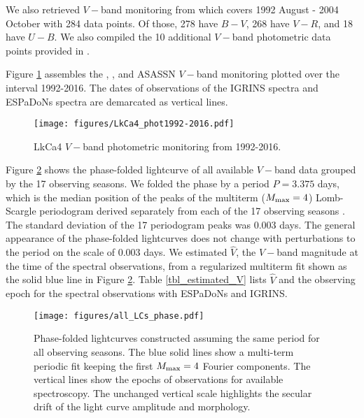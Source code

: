 \documentclass[onecolumn]{emulateapj}%
\newcommand{\name}{LkCa4 }
\begin{document}
We also retrieved $V-$band monitoring from \citet{grankin08} which covers 1992 August - 2004 October with 284 data points.  Of those, 278 have $B-V$, 268 have $V-R$, and 18 have $U-B$.  We also compiled the 10 additional $V-$band photometric data points provided in \citet{2014MNRAS.444.3220D}.

Figure \ref{fig:PhotTime} assembles the \citet{grankin08}, \citet{2014MNRAS.444.3220D}, and ASASSN $V-$band monitoring plotted over the interval 1992-2016.  The dates of observations of the IGRINS spectra and ESPaDoNs spectra are demarcated as vertical lines.

\begin{figure*}
	\centering
	\texttt{[image: figures/LkCa4\_phot1992-2016.pdf]}
	\caption{\name $V-$band photometric monitoring from 1992-2016.}
	\label{fig:PhotTime}
\end{figure*}

Figure \ref{fig:PhotPhase} shows the phase-folded lightcurve of all available $V-$band data grouped by the 17 observing seasons.  We folded the phase by a period $P=3.375$ days, which is the median position of the peaks of the multiterm ($M_{\rm max} = 4$) Lomb-Scargle periodogram derived separately from each of the 17 observing seasons \citep{2014sdmm.book.....I}.  The standard deviation of the 17 periodogram peaks was 0.003 days.  The general appearance of the phase-folded lightcurves does not change with perturbations to the period on the scale of 0.003 days.  We estimated $\hat V$, the $V-$band magnitude at the time of the spectral observations, from a regularized multiterm fit \citep{2015ApJ...812...18V} shown as the solid blue line in Figure \ref{fig:PhotPhase}.  Table \ref{tbl_estimated_V} lists $\hat V$ and the observing epoch for the spectral observations with ESPaDoNs and IGRINS.

\begin{figure*}
	\centering
	\texttt{[image: figures/all\_LCs\_phase.pdf]}
	\caption{Phase-folded lightcurves constructed assuming the same period for all observing seasons.  The blue solid lines show a multi-term periodic fit keeping the first $M_{\rm max}=4$ Fourier components.  The vertical lines show the epochs of observations for available spectroscopy.  The unchanged vertical scale highlights the secular drift of the light curve amplitude and morphology.}
	\label{fig:PhotPhase}
\end{figure*}



\end{document}
